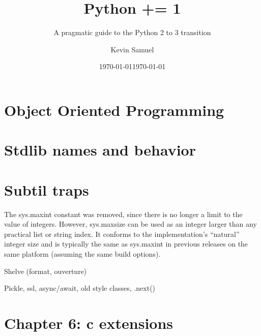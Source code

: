 \documentclass[paperwidth=8in, paperheight=10in,lang=en]{elegantbook}
\title{Python += 1}
\subtitle{A pragmatic guide to the Python 2 to 3 transition}
\institute{Bite Code}
\date{\today}
\author{Kevin Samuel}
\date{\today}
\begin{document}
\maketitle

\frontmatter

\tableofcontents



\mainmatter

\hypersetup{pageanchor=true}















\chapter{Object Oriented Programming}\label{chap:oop}

\chapter{Stdlib names and behavior}

\chapter{Subtil traps}

The sys.maxint constant was removed, since there is no longer a limit to the value of integers. However, sys.maxsize can be used as an integer larger than any practical list or string index. It conforms to the implementation’s “natural” integer size and is typically the same as sys.maxint in previous releases on the same platform (assuming the same build options).

Shelve (format, ouverture)


Pickle, ssl, async/await, old style classes, .next()

\chapter{Chapter 6:  c extensions}
\end{document}
